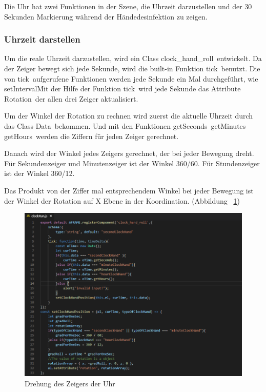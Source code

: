  Die Uhr hat zwei Funktionen in der Szene, die Uhrzeit darzustellen und der 30 Sekunden Markierung während der Händedesinfektion zu zeigen.
 
 \subsubsection{Uhrzeit darstellen}
 
 Um die reale Uhrzeit darzustellen, wird ein Class \glqq clock\_hand\_roll\grqq\ entwickelt. Da der Zeiger bewegt sich jede Sekunde, wird die built-in Funktion \glqq tick\grqq\ benutzt. Die von \glqq tick\grqq\ aufgerufene Funktionen werden jede Sekunde ein Mal durchgeführt, wie \glqq setInterval\grqq\.
 
 Mit der Hilfe der Funktion \glqq tick\grqq\ wird jede Sekunde das Attribute \glqq Rotation\grqq\ der allen drei Zeiger aktualisiert. 
 
 Um der Winkel der Rotation zu rechnen wird zuerst die aktuelle Uhrzeit durch das Class \glqq Data\grqq\ bekommen. Und mit den Funktionen \glqq getSeconds\grqq\, \glqq getMinutes\grqq\, \glqq getHours\grqq\ werden die Ziffern für jeden Zeiger gerechnet.
 
 Danach wird der Winkel jedes Zeigers gerechnet, der bei jeder Bewegung dreht. Für Sekundenzeiger und Minutenzeiger ist der Winkel 360/60. Für Stundenzeiger ist der Winkel 360/12.
 
 Das Produkt von der Ziffer mal entsprechendem Winkel bei jeder Bewegung ist der Winkel der Rotation auf X Ebene in der Koordination. (Abbildung ~\ref{fig:clockRoll})
 
\begin{figure}[ht]
\vspace*{0.2cm}
\centering
\includegraphics[width=\textwidth]{images/clockRoll.png}
\caption[Drehung des Zeigers der Uhr]{Drehung des Zeigers der Uhr}
\label{fig:clockRoll} 
\end{figure}
 
